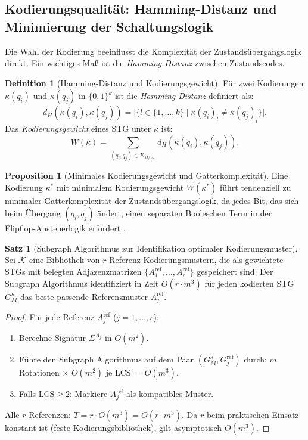 ﻿\documentclass[a4paper,12pt]{article}
\theoremstyle{definition}
\newtheorem{definition}{Definition}
\newtheorem{satz}{Satz}
\newtheorem{proposition}{Proposition}
\begin{document}
\subsection{Kodierungsqualität: Hamming-Distanz und Minimierung der Schaltungslogik}

Die Wahl der Kodierung beeinflusst die Komplexität der Zustandsübergangslogik direkt.
Ein wichtiges Maß ist die \emph{Hamming-Distanz} zwischen Zustandscodes.

\begin{definition}[Hamming-Distanz und Kodierungsgewicht]\label{def:hamming}
  Für zwei Kodierungen $\kappa(q_i)$ und $\kappa(q_j)$ in $\{0,1\}^k$ ist die
  \emph{Hamming-Distanz} definiert als:
  \[
    d_H(\kappa(q_i), \kappa(q_j))
    = \bigl|\bigl\{l \in \{1,\ldots,k\} \;\big|\; \kappa(q_i)_l \neq \kappa(q_j)_l\bigr\}\bigr|.
  \]
  Das \emph{Kodierungsgewicht} eines STG unter $\kappa$ ist:
  \[
    W(\kappa) = \sum_{(q_i, q_j) \in E_{M/{\sim}}} d_H(\kappa(q_i), \kappa(q_j)).
  \]
\end{definition}

\begin{proposition}[Minimales Kodierungsgewicht und Gatterkomplexität]\label{prop:gatter}
  Eine Kodierung $\kappa^*$ mit minimalem Kodierungsgewicht $W(\kappa^*)$ führt tendenziell
  zu minimaler Gatterkomplexität der Zustandsübergangslogik, da jedes Bit, das sich beim
  Übergang $(q_i, q_j)$ ändert, einen separaten Booleschen Term in der
  Flipflop-Ansteuerlogik erfordert \cite[S.~100]{ciletti2011}.
\end{proposition}

\begin{satz}[Subgraph Algorithmus zur Identifikation optimaler Kodierungsmuster]\label{satz:optkod}
  Sei $\mathcal{K}$ eine Bibliothek von $r$ Referenz-Kodierungsmustern, die als
  gewichtete STGs mit belegten Adjazenzmatrizen $\{A_1^{\text{ref}}, \ldots, A_r^{\text{ref}}\}$
  gespeichert sind. Der Subgraph Algorithmus identifiziert in Zeit $O(r \cdot m^3)$
  für jeden kodierten STG $G_M^\kappa$ das beste passende Referenzmuster $A_j^{\text{ref}}$.
\end{satz}

\begin{proof}
  Für jede Referenz $A_j^{\text{ref}}$ ($j = 1, \ldots, r$):
  \begin{enumerate}
    \item Berechne Signatur $\Sigma^{A_j}$ in $O(m^2)$.
    \item Führe den Subgraph Algorithmus auf dem Paar $(G_M^\kappa, G_j^{\text{ref}})$
          durch: $m$ Rotationen $\times$ $O(m^2)$ je LCS $= O(m^3)$.
    \item Falls $\text{LCS} \geq 2$: Markiere $A_j^{\text{ref}}$ als kompatibles Muster.
  \end{enumerate}
  Alle $r$ Referenzen: $T = r \cdot O(m^3) = O(r \cdot m^3)$. Da $r$ beim praktischen
  Einsatz konstant ist (feste Kodierungsbibliothek), gilt asymptotisch $O(m^3)$.
\end{proof}
\end{document}
